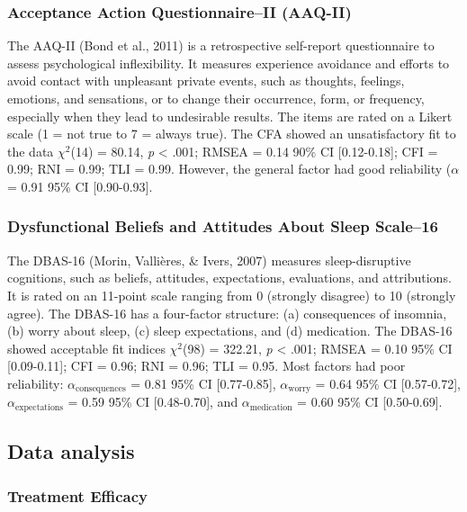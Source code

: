 \documentclass[
  english,
  man]{apa6}
\begin{document}
\subsubsection{Acceptance Action Questionnaire--II (AAQ-II)}\label{acceptance-action-questionnaireii-aaq-ii}

The AAQ-II (Bond et al., 2011) is a retrospective self-report questionnaire to assess psychological inflexibility. It measures experience avoidance and efforts to avoid contact with unpleasant private events, such as thoughts, feelings, emotions, and sensations, or to change their occurrence, form, or frequency, especially when they lead to undesirable results. The items are rated on a Likert scale (1 = not true to 7 = always true). The CFA showed an unsatisfactory fit to the data \(\chi^2\)(14) = 80.14, \emph{p} \textless{} .001; RMSEA = 0.14 90\% CI {[}0.12-0.18{]}; CFI = 0.99; RNI = 0.99; TLI = 0.99. However, the general factor had good reliability (\(\alpha\) = 0.91 95\% CI {[}0.90-0.93{]}.

\subsubsection{Dysfunctional Beliefs and Attitudes About Sleep Scale--16}\label{dysfunctional-beliefs-and-attitudes-about-sleep-scale16}

The DBAS-16 (Morin, Vallières, \& Ivers, 2007) measures sleep-disruptive cognitions, such as beliefs, attitudes, expectations, evaluations, and attributions. It is rated on an 11-point scale ranging from 0 (strongly disagree) to 10 (strongly agree). The DBAS-16 has a four-factor structure: (a) consequences of insomnia, (b) worry about sleep, (c) sleep expectations, and (d) medication. The DBAS-16 showed acceptable fit indices \(\chi^2\)(98) = 322.21, \emph{p} \textless{} .001; RMSEA = 0.10 95\% CI {[}0.09-0.11{]}; CFI = 0.96; RNI = 0.96; TLI = 0.95. Most factors had poor reliability: \(\alpha_{\text{consequences}}\) = 0.81 95\% CI {[}0.77-0.85{]}, \(\alpha_{\text{worry}}\) = 0.64 95\% CI {[}0.57-0.72{]}, \(\alpha_{\text{expectations}}\) = 0.59 95\% CI {[}0.48-0.70{]}, and \(\alpha_{\text{medication}}\) = 0.60 95\% CI {[}0.50-0.69{]}.

\subsection{Data analysis}\label{data-analysis}

\subsubsection{Treatment Efficacy}\label{treatment-efficacy}
\end{document}
